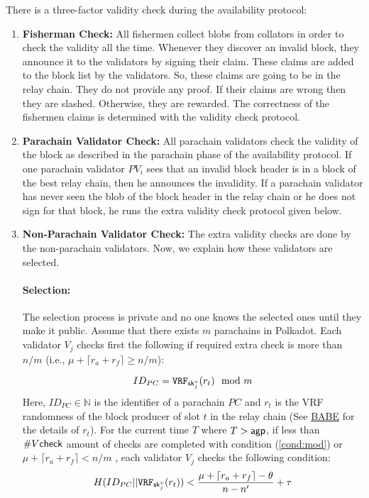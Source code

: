 There is a three-factor validity check during the availability protocol:


\begin{enumerate}

      
    \item \textbf{Fisherman Check:} All fishermen collect blobs from collators in order to check the validity all the time. Whenever they discover an invalid block, they announce it to the validators by signing their claim. These claims are added to the block list by the validators. So, these claims are going to be in the relay chain. They do not provide any proof. If their claims are wrong then they are slashed. Otherwise, they are rewarded. The correctness of the fishermen claims is determined with the validity check protocol.
    
    \item \textbf{Parachain Validator Check:} All parachain validators check the validity of the block as described in the parachain phase of the availability protocol. If one parachain validator $PV_i$ sees that an invalid block header is in a block of the best relay chain, then he announces the invalidity. If a parachain validator has never seen the blob of the block header in the relay chain or he does not sign for that block, he runs the extra validity check protocol given below.
    
    \item \textbf{Non-Parachain Validator Check:} The extra validity checks are done by the non-parachain validators. Now, we explain how these validators are selected.
    
    \paragraph{Selection:} The selection process is private and no one knows the selected ones until they make it public. Assume that there exists $m$ parachains in Polkadot. Each validator $V_j$ checks first the following if required extra check is more than $n/m$ (i.e., $\mu + \lceil r_a + r_f \rceil \geq n/m$): 
    
    \begin{equation}\label{cond:mod}
        ID_{PC} = \mathtt{VRF}_{\mathsf{sk}^v_{j}}(r_{t}) \mod m    
    \end{equation}
     Here, $ID_{PC} \in \mathbb{N}$ is the identifier of a parachain $PC$ and $r_{t}$ is the VRF randomness of the block producer of slot $t$ in the relay chain (See \href{http://research.web3.foundation/en/latest/polkadot/BABE/Babe/}{BABE} for the details of $r_t$). For the current time $T$ where $T > \mathsf{agp}$, if  less than $\#V\mathsf{check}$ amount of checks are completed with condition (\ref{cond:mod}) or $\mu + \lceil r_a + r_f \rceil < n/m$ , each validator $V_j$ checks the following condition:
     \begin{equation}\label{cond:time}
        H(ID_{PC} || \mathtt{VRF}_{\mathsf{sk}^v_j}(r_t)) < \frac{\mu + \lceil r_a + r_f \rceil - \theta}{n-n'}+\tau  
    \end{equation}
    

\end{enumerate}
